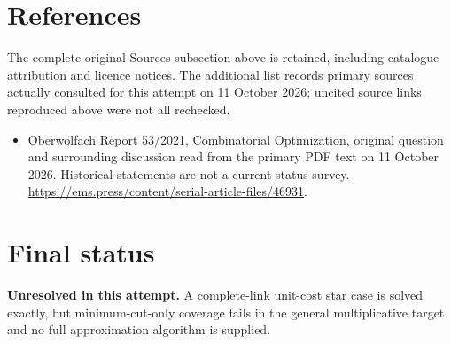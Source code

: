 \documentclass[11pt]{article}
\begin{document}
\section{References}
The complete original Sources subsection above is retained, including catalogue attribution and licence notices. The additional list records primary sources actually consulted for this attempt on 11 October 2026; uncited source links reproduced above were not all rechecked.
\begin{itemize}
\item Oberwolfach Report 53/2021, Combinatorial Optimization, original question and surrounding discussion read from the primary PDF text on 11 October 2026. Historical statements are not a current-status survey. \url{https://ems.press/content/serial-article-files/46931}.
\end{itemize}
\section{Final status}
\textbf{Unresolved in this attempt.} A complete-link unit-cost star case is solved exactly, but minimum-cut-only coverage fails in the general multiplicative target and no full approximation algorithm is supplied.
\end{document}
